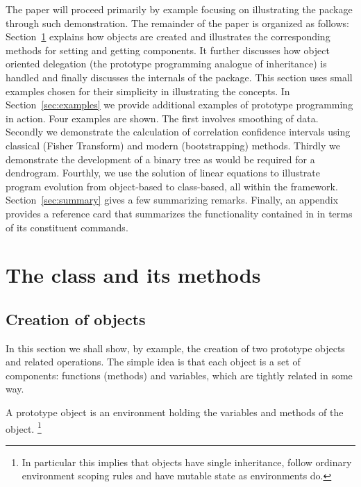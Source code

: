 \documentclass{Z}
\begin{document}
The paper will proceed primarily by example focusing on illustrating
the package  through such demonstration.  The remainder of
the paper is organized as follows: Section~\ref{sec:proto-class}
explains how  objects are created and illustrates the
corresponding methods for setting and getting components.  It further
discusses how object oriented delegation (the prototype programming
analogue of inheritance) is handled and finally discusses the
internals of the package.  This section uses small examples chosen for
their simplicity in illustrating the concepts.  In
Section~\ref{sec:examples} we provide additional examples of prototype
programming in action.  Four examples are shown.  The first involves
smoothing of data.  Secondly we demonstrate the calculation of
correlation confidence intervals using classical (Fisher Transform)
and modern (bootstrapping) methods.  Thirdly we demonstrate the
development of a binary tree as would be required for a dendrogram.
Fourthly, we use the solution of linear equations to illustrate
program evolution from object-based to class-based, all
within the  framework.
Section~\ref{sec:summary} gives a few summarizing remarks.  Finally,
an appendix provides a reference card that summarizes the
functionality contained in  in terms of its constituent
commands.


\section[The class "proto" and its methods]{The class  and its methods}
\label{sec:proto-class}

\subsection[Creation of "proto" objects]{Creation of  objects}
\label{sec:proto}

In this section we shall show, by example, the creation of two
prototype objects and related operations.  The simple idea is that
each  object is a set of components: functions (methods)
and variables, which are tightly related in some way.  

A prototype object is an environment holding the variables and
methods of the object. \footnote{In particular this implies that 
 objects have single inheritance, follow ordinary
environment scoping rules and have mutable state as environments
do.}
\end{document}
